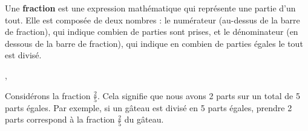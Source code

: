 \documentclass{article}
\begin{document}
\begin{tcolorbox}[colback=cyan!10!white, colframe=red!75!black, title=\textcolor{white}{Définition}, 
                  sharp corners=southwest]
    Une \textbf{fraction} est une expression mathématique qui représente une partie d'un tout. Elle est composée de deux nombres : le \textcolor{}{numérateur} (au-dessus de la barre de fraction), qui indique combien de parties sont prises, et le \textcolor{}{dénominateur} (en dessous de la barre de fraction), qui indique en combien de parties égales le tout est divisé.
\end{tcolorbox}

\vspace{0.2cm},
\begin{tcolorbox}[colback=orange!10!white, colframe=orange!75!black, sharp corners=south, boxrule=0.8mm, title=\textcolor{white}{Exemple}]
    Considérons la fraction \(\frac{2}{5}\). Cela signifie que nous avons 2 parts sur un total de 5 parts égales. Par exemple, si un gâteau est divisé en 5 parts égales, prendre 2 parts correspond à la fraction \(\frac{2}{5}\) du gâteau.

    \vspace{10pt}
    \centering
\end{tcolorbox}

\vspace{0.2cm}
\end{document}
